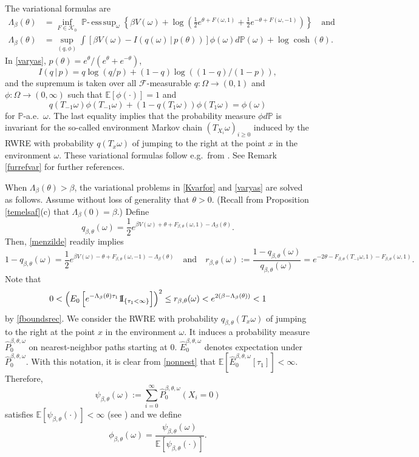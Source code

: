 \documentclass[a4paper]{amsart}
\numberwithin{equation}{section}
\theoremstyle{plain}
\theoremstyle{remark}
\begin{document}
The variational formulas are
\begin{align}
\Lambda_\beta(\theta) &= \inf_{F\in\mathcal{K}_0}{\mathop{\mathbb{P}\mbox{-}\,\mathrm{ess\,sup}}}_{\omega}\left\{\beta V(\omega) + \log\left(\frac1{2}e^{\theta + F(\omega,1)} + \frac1{2}e^{- \theta + F(\omega,-1)}\right)\right\}\quad\text{and}\label{Kvarfor}\\
\Lambda_\beta(\theta) &= \sup_{(q,\phi)}\int \left[\beta V(\omega) - I(q(\omega)\,|\,p(\theta))\right]\phi(\omega)d\mathbb{P}(\omega) + \log\cosh(\theta).\label{varyas}
\end{align}
In \eqref{varyas}, $p(\theta) = e^\theta/(e^\theta + e^{-\theta})$,
$$I(q\,|\,p) = q\log(q/p) + (1-q)\log({(1-q)}/{(1-p)}),$$
and the supremum is taken over all $\mathcal{F}$-measurable $q:\Omega\to(0,1)$ and $\phi:\Omega\to(0,\infty)$ such that $\mathbb{E}[\phi(\cdot)] = 1$ and
$$q(T_{-1}\omega)\phi(T_{-1}\omega) + (1 - q(T_1\omega))\phi(T_1\omega) = \phi(\omega)$$
for $\mathbb{P}$-a.e.\ $\omega$. The last equality implies that the probability measure $\phi d\mathbb{P}$ is invariant for the so-called environment Markov chain $(T_{X_i}\omega)_{i\ge0}$ induced by the RWRE with probability $q(T_x\omega)$ of jumping to the right at the point $x$ in the environment $\omega$. 
{}{These variational formulas follow e.g.\ from \cite[Theorem 2.1]{Yil2009}. See
Remark \ref{furrefvar} for further references.}

When $\Lambda_\beta(\theta) > \beta$, the variational problems in \eqref{Kvarfor} and \eqref{varyas} are solved as follows. Assume without loss of generality that $\theta>0$. (Recall from Proposition \ref{temelsaf}(c) that $\Lambda_\beta(0) = \beta$.) Define $$q_{\beta,\theta}(\omega) = \frac1{2}e^{\beta V(\omega) + \theta + F_{\beta,\theta}(\omega,1) - \Lambda_\beta(\theta)}.$$
Then, \eqref{menzilde} readily implies
$$1 - q_{\beta,\theta}(\omega) = \frac1{2}e^{\beta V(\omega) - \theta + F_{\beta,\theta}(\omega,-1) - \Lambda_\beta(\theta)}\quad\text{and}\quad r_{\beta,\theta}(\omega) := \frac{1-q_{\beta,\theta}(\omega)}{q_{\beta,\theta}(\omega)} = e^{-2\theta - F_{\beta,\theta}(T_{-1}\omega,1) - F_{\beta,\theta}(\omega,1)}.$$
Note that
\begin{equation}\label{nonnest}
0< \left(E_0\left[e^{-\Lambda_\beta(\theta)\tau_1}{{{\rm 1\mkern-1.5mu}\!{\rm I}}}_{\{\tau_1<\infty\}}\right]\right)^2 \le r_{\beta,\theta}(\omega) < e^{2(\beta - \Lambda_\beta(\theta))} < 1
\end{equation}
by \eqref{fboundsrec}. 
We consider the RWRE with probability $q_{\beta,\theta}(T_x\omega)$ of jumping to the right at the point $x$ in the environment $\omega$. It induces a probability measure $\hat P_0^{\beta,\theta,\omega}$ on nearest-neighbor paths starting at $0$. $\hat E_0^{\beta,\theta,\omega}$ denotes expectation under $\hat P_0^{\beta,\theta,\omega}$. With this notation, it is clear from \eqref{nonnest} that $\mathbb{E}\left[\hat E_0^{\beta,\theta,\omega}[\tau_1]\right] < \infty$. Therefore,
$$\psi_{\beta,\theta}(\omega) := \sum_{i=0}^\infty \hat P_0^{\beta,\theta,\omega}(X_i = 0)$$
satisfies $\mathbb{E}[\psi_{\beta,\theta}(\cdot)] < \infty$ (see \cite[Theorem 5.17]{Yil2009}) and we define
$$\phi_{\beta,\theta}(\omega) = \frac{\psi_{\beta,\theta}(\omega)}{\mathbb{E}[\psi_{\beta,\theta}(\cdot)]}.$$
\end{document}
